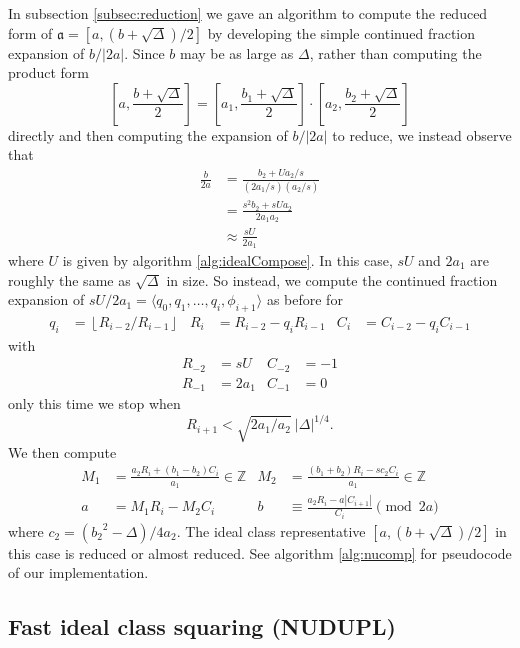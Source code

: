 \documentclass{ucalgthes1}
\theoremstyle{plain}
\theoremstyle{definition}
\newcommand{\ZZ}{\mathbb{Z}}
\newcommand{\floor}[1]{\left\lfloor #1 \right\rfloor}
\begin{document}
In subsection \ref{subsec:reduction} we gave an algorithm to compute the reduced form of \break$\mathfrak a = [a, (b+\sqrt\Delta)/2]$ by developing the simple continued fraction expansion of $b/|2a|$.  Since $b$ may be as large as $\Delta$, rather than computing the product form
\[
	\left[a, \frac{b+\sqrt\Delta}{2} \right] = \left[a_1, \frac{b_1+\sqrt\Delta}{2} \right] \cdot \left[a_2, \frac{b_2+\sqrt\Delta}{2} \right]
\]
directly and then computing the expansion of $b/|2a|$ to reduce, we instead observe that
\begin{align*}
	\frac{b}{2a} &= \frac{b_2 + Ua_2/s}{(2a_1/s)(a_2/s)} \\
	&= \frac{s^2 b_2+sUa_2}{2a_1a_2} \\
	&\approx \frac{sU}{2a_1}
\end{align*}
where $U$ is given by algorithm \ref{alg:idealCompose}.  In this case, $sU$ and $2a_1$ are roughly the same as $\sqrt\Delta$ in size.  So instead, we compute the continued fraction expansion of $sU/2a_1 = \langle q_0, q_1, \dots, q_i, \phi_{i+1} \rangle$ as before for
\begin{align*}
	q_i &= \floor{R_{i-2} / R_{i-1}} &
	R_i &= R_{i-2} - q_i R_{i-1} &
	C_i &= C_{i-2} - q_i C_{i-1}
\end{align*}
with
\begin{align*}
	R_{-2} &= sU  & C_{-2} &= -1 \\
	R_{-1} &= 2a_1 & C_{-1} &= 0
\end{align*}
only this time we stop when
\[
	R_{i+1} < \sqrt{2a_1/a_2} ~ |\Delta|^{1/4}.
\]
We then compute
\begin{align*}
	M_1 &= \frac{a_2 R_i + (b_1-b_2)C_i}{a_1}  \in \ZZ &
	M_2 &= \frac{(b_1+b_2) R_i - s c_2 C_i}{a_1} \in \ZZ \\
	a &= M_1 R_i - M_2 C_i &
	b &\equiv \frac{a_2 R_i - a |C_{i+1}|}{C_i} \pmod{2a}
\end{align*}
where $c_2 = ({b_2}^2-\Delta)/4a_2$.  The ideal class representative $[a, (b+\sqrt\Delta)/2]$ in this case is reduced or almost reduced.  See algorithm \ref{alg:nucomp} for pseudocode of our implementation.




\subsection{Fast ideal class squaring (NUDUPL)}
\end{document}
